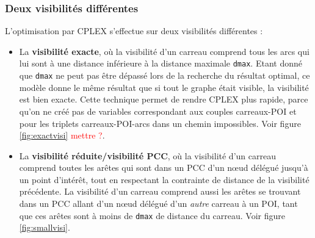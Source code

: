 

\subsubsection{Deux visibilités différentes} \label{sect:2visi}

L'optimisation par CPLEX s'effectue sur deux visibilités différentes : 

\begin{itemize}
    \item La \textbf{visibilité exacte}, où la visibilité d'un carreau comprend tous les arcs qui lui sont à une distance inférieure à la distance maximale \texttt{dmax}. Etant donné que \texttt{dmax} ne peut pas être dépassé lors de la recherche du résultat optimal, ce modèle donne le même résultat que si tout le graphe était visible, la visibilité est bien exacte. Cette technique permet de rendre CPLEX plus rapide, parce qu'on ne créé pas de variables correspondant aux couples carreaux-POI et pour les triplets carreaux-POI-arcs dans un chemin impossibles. Voir figure \ref{fig:exactvisi} \textcolor{red}{mettre ?}.%

    \item La \textbf{visibilité réduite/visibilité PCC}, où la visibilité d'un carreau comprend toutes les arêtes qui sont dans un PCC d'un nœud délégué jusqu'à un point d'intérêt, tout en respectant la contrainte de distance de la visibilité précédente. La visibilité d'un carreau comprend aussi les arêtes se trouvant dans un PCC allant d'un nœud délégué d'un \emph{autre} carreau à un POI, tant que ces arêtes sont à moins de \texttt{dmax} de distance du carreau. Voir figure \ref{fig:smallvisi}.
\end{itemize} 

